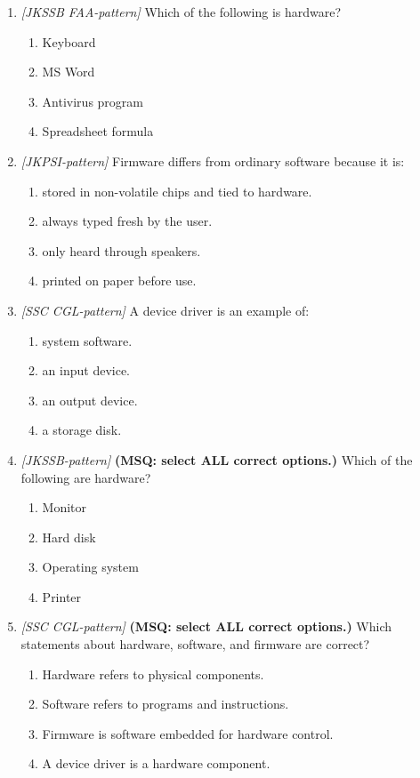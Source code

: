 \documentclass[11pt]{article}
\begin{document}
\begin{enumerate}[label=\textbf{Q\arabic*.}, leftmargin=*]
\item \textit{[JKSSB FAA-pattern]} Which of the following is hardware?
  \begin{enumerate}[label=\Alph*.]
    \item Keyboard
    \item MS Word
    \item Antivirus program
    \item Spreadsheet formula
  \end{enumerate}
\item \textit{[JKPSI-pattern]} Firmware differs from ordinary software because it is:
  \begin{enumerate}[label=\Alph*.]
    \item stored in non-volatile chips and tied to hardware.
    \item always typed fresh by the user.
    \item only heard through speakers.
    \item printed on paper before use.
  \end{enumerate}
\item \textit{[SSC CGL-pattern]} A device driver is an example of:
  \begin{enumerate}[label=\Alph*.]
    \item system software.
    \item an input device.
    \item an output device.
    \item a storage disk.
  \end{enumerate}
\item \textit{[JKSSB-pattern]} \textbf{(MSQ: select ALL correct options.)} Which of the following are hardware?
  \begin{enumerate}[label=\Alph*.]
    \item Monitor
    \item Hard disk
    \item Operating system
    \item Printer
  \end{enumerate}
\item \textit{[SSC CGL-pattern]} \textbf{(MSQ: select ALL correct options.)} Which statements about hardware, software, and firmware are correct?
  \begin{enumerate}[label=\Alph*.]
    \item Hardware refers to physical components.
    \item Software refers to programs and instructions.
    \item Firmware is software embedded for hardware control.
    \item A device driver is a hardware component.
  \end{enumerate}
\end{enumerate}
\def\JKSSBLessonID{17}\def\JKSSBAnswers{0}
\end{document}
